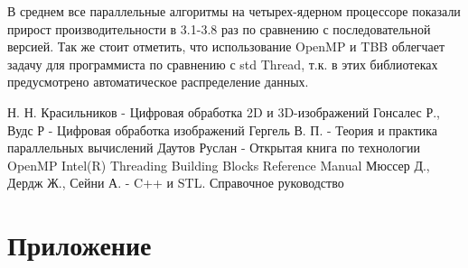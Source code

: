 \documentclass{report}
\begin{document}
	В среднем все параллельные алгоритмы на четырех-ядерном процессоре показали прирост производительности  в 3.1-3.8 раз по сравнению с последовательной версией. Так же стоит отметить, что использование OpenMP и TBB облегчает задачу для программиста по сравнению с std Thread, т.к. в этих библиотеках предусмотрено автоматическое распределение данных.
	
	\newpage
	\begin{thebibliography}{1}
		 Н. Н. Красильников - Цифровая обработка 2D и 3D-изображений
		 Гонсалес Р., Вудс Р - Цифровая обработка изображений
		 Гергель В. П. - Теория и практика параллельных вычислений
		 Даутов Руслан - Открытая книга по технологии OpenMP
		 Intel(R) Threading Building Blocks Reference Manual
		 Мюссер Д., Дердж Ж., Сейни А. - C++ и STL. Справочное руководство
	\end{thebibliography}
	
	\newpage
	\section*{Приложение}
	
\end{document}
